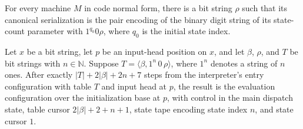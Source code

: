 \begin{lemma}
\label{Turing.universal_serialization_header}
\leanok
{}
For every machine $M$ in code normal form, there is a bit string $\rho$ such that its
canonical serialization is the pair encoding of the binary digit string of its
state-count parameter with $1^{q_0}0\rho$, where $q_0$ is the initial state index.
\end{lemma}

\begin{lemma}
\label{Turing.universalInterpreter_initialize}
\leanok
{}
Let $x$ be a bit string, let $p$ be an input-head position on $x$, and let $\beta$,
$\rho$, and $T$ be bit strings with $n\in\mathbb{N}$. Suppose
$T=\langle\beta,1^n\,0\,\rho\rangle$, where $1^n$ denotes a string of $n$ ones. After
exactly $|T|+2|\beta|+2n+7$ steps from the interpreter's entry configuration with table
$T$ and input head at $p$, the result is the evaluation configuration over the
initialization base at $p$, with control in the main dispatch state, table cursor
$2|\beta|+2+n+1$, state tape encoding state index $n$, and state cursor $1$.
\end{lemma}

